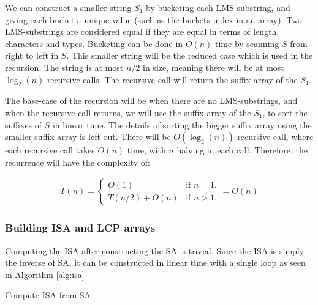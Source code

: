 We can construct a smaller string $S_1$ by bucketing each LMS-substring, and giving each
bucket a unique value (such as the buckets index in an array). Two LMS-substrings are
considered equal if they are equal in terms of length, characters and types. Bucketing can
be done in $O(n)$ time by scanning $S$ from right to left in $S$. This smaller
string will be the reduced case which is used in the recursion. The string is at most $n /
2$ in size, meaning there will be at most $\log_2(n)$ recursive calls. The recursive call
will return the suffix array of the $S_1$.

The base-case of the recursion will be when there are no LMS-substrings, and when the
recursive call returns, we will use the suffix array of the $S_1$, to sort the suffixes of
$S$ in linear time. The details of sorting the bigger suffix array using the smaller
suffix array is left out. There will be $O(\log_2(n))$ recursive call, where each
recursive call takes $O(n)$ time, with $n$ halving in each call. Therefore, the recurrence
will have the complexity of:

\begin{gather*}
    T(n) =
\begin{cases}
    O(1) & \text{if } n = 1. \\
    T(n / 2) + O(n) & \text{if } n > 1.
\end{cases}
= O(n)
\end{gather*}

\subsubsection{Building ISA and LCP arrays}

Computing the ISA after constructing the SA is trivial. Since the ISA is simply the inverse
of SA, it can be constructed in linear time with a single loop as seen in Algorithm
\ref{alg:isa}

\begin{algorithm}[htp]
  \SetAlgoLined\DontPrintSemicolon

  \vspace{0.5cm}
  \caption{Compute ISA from SA}
  \label{alg:isa}
\end{algorithm}


